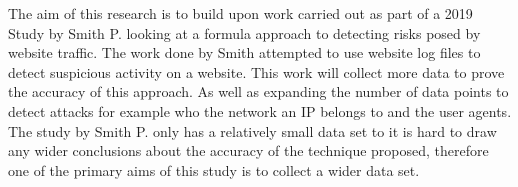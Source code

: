 The aim of this research is to build upon work carried out as part of a 2019 Study by Smith P. looking at a  formula approach to detecting risks posed by website traffic. The work done by Smith attempted to use website log files to detect suspicious activity on a website. This work will collect more data to prove the accuracy of this approach. As well as expanding the number of data points to detect attacks for example who the network an IP belongs to and the user agents. The study by Smith P. only has a relatively small data set to it is hard to draw any wider conclusions about the accuracy of the technique proposed, therefore one of the primary aims of this study is to collect a wider data set. 